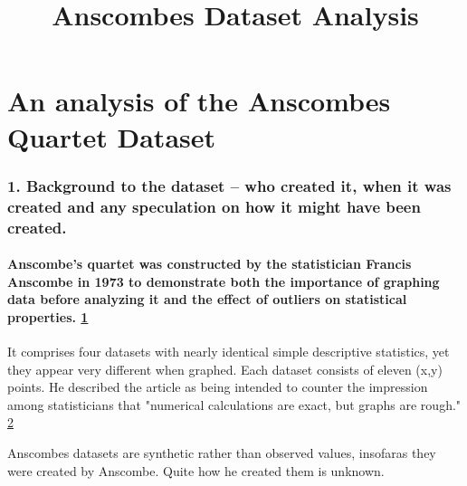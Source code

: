 \documentclass[11pt]{article}
\title{Anscombes Dataset Analysis}
\begin{document}
    
    
    \maketitle
    
    

    
    \section{An analysis of the Anscombes Quartet
Dataset}\label{an-analysis-of-the-anscombes-quartet-dataset}

    \subsubsection{1. Background to the dataset -- who created it, when it
was created and any speculation on how it might have been
created.}\label{background-to-the-dataset-who-created-it-when-it-was-created-and-any-speculation-on-how-it-might-have-been-created.}

\paragraph{\texorpdfstring{Anscombe's quartet was constructed by the
statistician Francis Anscombe in 1973 to demonstrate both the importance
of graphing data before analyzing it and the effect of outliers on
statistical properties.
\href{https://en.wikipedia.org/wiki/Anscombe\%27s_quartet}{1}}{Anscombe's quartet was constructed by the statistician Francis Anscombe in 1973 to demonstrate both the importance of graphing data before analyzing it and the effect of outliers on statistical properties. 1}}\label{anscombes-quartet-was-constructed-by-the-statistician-francis-anscombe-in-1973-to-demonstrate-both-the-importance-of-graphing-data-before-analyzing-it-and-the-effect-of-outliers-on-statistical-properties.-1}

It comprises four datasets with nearly identical simple descriptive
statistics, yet they appear very different when graphed. Each dataset
consists of eleven (x,y) points. He described the article as being
intended to counter the impression among statisticians that "numerical
calculations are exact, but graphs are rough."
\href{https://en.wikipedia.org/wiki/Anscombe\%27s_quartet}{2}

Anscombes datasets are synthetic rather than observed values, insofaras
they were created by Anscombe. Quite how he created them is unknown.
\end{document}
